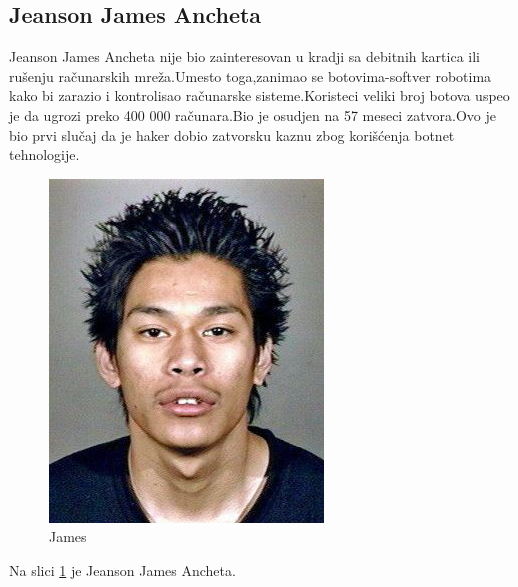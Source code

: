 \documentclass[a4paper]{article}
\begin{document}
\subsection{Jeanson James Ancheta}
Jeanson James Ancheta nije bio zainteresovan u kradji sa debitnih kartica ili rušenju računarskih mreža.Umesto toga,zanimao se botovima-softver robotima kako bi zarazio i kontrolisao računarske sisteme.Koristeci veliki broj botova uspeo je da ugrozi preko 400 000 računara.Bio je osudjen na 57 meseci zatvora.Ovo je bio prvi slučaj da je haker dobio zatvorsku kaznu zbog korišćenja botnet tehnologije.
\begin{figure}[h!]
	\begin{center}
		\includegraphics[scale=0.30]{james.jpg}
	\end{center}
	\caption{James}
	\label{fig:james}
\end{figure}

Na slici \ref{fig:james} je Jeanson James Ancheta.
\newpage
\end{document}
